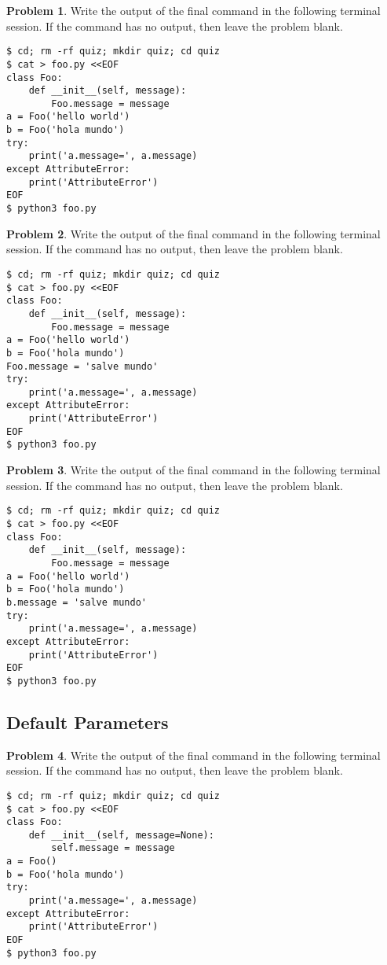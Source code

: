 \documentclass[10pt]{article}
\theoremstyle{definition}
\newtheorem{problem}{Problem}
\begin{document}
\filbreak
\begin{problem}
    Write the output of the final command in the following terminal session.
    If the command has no output, then leave the problem blank.
\end{problem}
\begin{lstlisting}
$ cd; rm -rf quiz; mkdir quiz; cd quiz
$ cat > foo.py <<EOF
class Foo:
    def __init__(self, message):
        Foo.message = message
a = Foo('hello world')
b = Foo('hola mundo')
try:
    print('a.message=', a.message)
except AttributeError:
    print('AttributeError') 
EOF
$ python3 foo.py
\end{lstlisting}

\filbreak
\begin{problem}
    Write the output of the final command in the following terminal session.
    If the command has no output, then leave the problem blank.
\end{problem}
\begin{lstlisting}
$ cd; rm -rf quiz; mkdir quiz; cd quiz
$ cat > foo.py <<EOF
class Foo:
    def __init__(self, message):
        Foo.message = message
a = Foo('hello world')
b = Foo('hola mundo')
Foo.message = 'salve mundo'
try:
    print('a.message=', a.message)
except AttributeError:
    print('AttributeError') 
EOF
$ python3 foo.py
\end{lstlisting}

\filbreak
\begin{problem}
    Write the output of the final command in the following terminal session.
    If the command has no output, then leave the problem blank.
\end{problem}
\begin{lstlisting}
$ cd; rm -rf quiz; mkdir quiz; cd quiz
$ cat > foo.py <<EOF
class Foo:
    def __init__(self, message):
        Foo.message = message
a = Foo('hello world')
b = Foo('hola mundo')
b.message = 'salve mundo'
try:
    print('a.message=', a.message)
except AttributeError:
    print('AttributeError') 
EOF
$ python3 foo.py
\end{lstlisting}

\subsection{Default Parameters}

\filbreak
\begin{problem}
    Write the output of the final command in the following terminal session.
    If the command has no output, then leave the problem blank.
\end{problem}
\begin{lstlisting}
$ cd; rm -rf quiz; mkdir quiz; cd quiz
$ cat > foo.py <<EOF
class Foo:
    def __init__(self, message=None):
        self.message = message
a = Foo()
b = Foo('hola mundo')
try:
    print('a.message=', a.message)
except AttributeError:
    print('AttributeError') 
EOF
$ python3 foo.py
\end{lstlisting}
\end{document}
